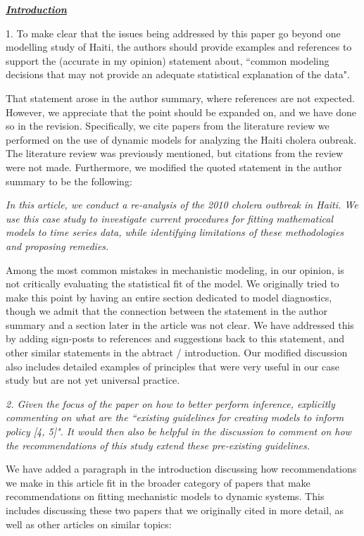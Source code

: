 \documentclass[11pt]{article}
\newcommand\report[1]{{\color{mygreen} \vspace{1mm}\hspace{0.25in}\parbox{6in}{\em #1}}}
\newcommand\article[1]{{\color{blue} \vspace{1mm}\hspace{0.25in}\parbox{6in}{\em #1}}}
\begin{document}
\report{
  \textbf{\underline{Introduction}}

1.  To make clear that the issues being addressed by this paper go beyond one modelling study of Haiti, the authors should provide examples and references to support the (accurate in my opinion) statement about, ``common modeling decisions that may not provide an adequate statistical explanation of the data".
}

That statement arose in the author summary, where references are not expected.
However, we appreciate that the point should be expanded on, and we have done so in the revision. Specifically, we cite papers from the literature review we performed on the use of dynamic models for analyzing the Haiti cholera oubreak. The literature review was previously mentioned, but citations from the review were not made. Furthermore, we modified the quoted statement in the author summary to be the following:

\article{In this article, we conduct a re-analysis of the 2010 cholera outbreak in Haiti. We use this case study to investigate current procedures for fitting mathematical models to time series data, while identifying limitations of these methodologies and proposing remedies.}

Among the most common mistakes in mechanistic modeling, in our opinion, is not critically evaluating the statistical fit of the model.
We originally tried to make this point by having an entire section dedicated to model diagnostics, though we admit that the connection between the statement in the author summary and a section later in the article was not clear.
We have addressed this by adding sign-posts to references and suggestions back to this statement, and other similar statements in the abtract / introduction.
Our modified discussion also includes detailed examples of principles that were very useful in our case study but are not yet universal practice.

\report{2.
  Given the focus of the paper on how to better perform inference, explicitly commenting on what are the ``existing guidelines for creating models to inform policy [4, 5]". It would then also be helpful in the discussion to comment on how the recommendations of this study extend these pre-existing guidelines.
}

We have added a paragraph in the introduction discussing how recommendations we make in this article fit in the broader category of papers that make recommendations on fitting mechanistic models to dynamic systems. This includes discussing these two papers that we originally cited in more detail, as well as other articles on similar topics:
\end{document}
